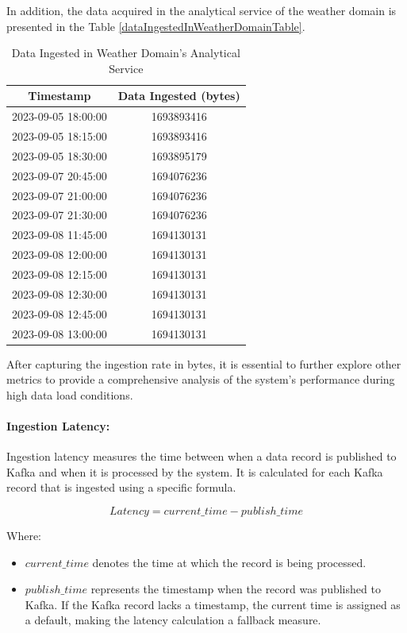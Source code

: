 \documentclass[preprint,12pt]{elsarticle}
\begin{document}
In addition, the data acquired in the analytical service of the weather domain is presented in the Table \ref{dataIngestedInWeatherDomainTable}.

\begin{table}[ht]
  \centering
  \caption{Data Ingested in Weather Domain's Analytical Service}
  \begin{tabular}{|c|c|}
  \hline
  \textbf{Timestamp} & \textbf{Data Ingested (bytes)} \\
  \hline
  2023-09-05 18:00:00 & 1693893416 \\
  2023-09-05 18:15:00 & 1693893416 \\
  2023-09-05 18:30:00 & 1693895179 \\
  2023-09-07 20:45:00 & 1694076236 \\
  2023-09-07 21:00:00 & 1694076236 \\
  2023-09-07 21:30:00 & 1694076236 \\
  2023-09-08 11:45:00 & 1694130131 \\
  2023-09-08 12:00:00 & 1694130131 \\
  2023-09-08 12:15:00 & 1694130131 \\
  2023-09-08 12:30:00 & 1694130131 \\
  2023-09-08 12:45:00 & 1694130131 \\
  2023-09-08 13:00:00 & 1694130131 \\
  \hline
  \end{tabular}
  \label{dataIngestedInWeatherDomainAnalyticalServiceTable}
\end{table}

After capturing the ingestion rate in bytes, it is essential to further explore other metrics to provide a comprehensive analysis of the system's performance during high data load conditions.


\paragraph{Ingestion Latency:}

Ingestion latency measures the time between when a data record is published to Kafka and when it is processed by the system. It is calculated for each Kafka record that is ingested using a specific formula.

\[ Latency = current\_time - publish\_time \] 

Where:
\begin{itemize}
    \item \(current\_time\) denotes the time at which the record is being processed.
    \item \(publish\_time\) represents the timestamp when the record was published to Kafka. If the Kafka record lacks a timestamp, the current time is assigned as a default, making the latency calculation a fallback measure.
\end{itemize}
\end{document}
